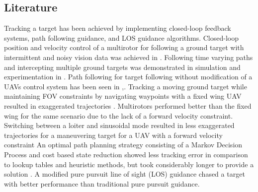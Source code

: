 \documentclass[conference]{IEEEtran}
\begin{document}
\subsection{Literature}








Tracking a target has been achieved by implementing closed-loop feedback systems, path following guidance, and LOS guidance algorithms. Closed-loop position and velocity control of a multirotor for following a ground target with intermittent and noisy vision data was achieved in \cite{teuliere_chasing_2011}. Following time varying paths and intercepting multiple ground targets was demonstrated in simulation and experimentation in \cite{oliveira_moving_2016}. Path following for target following without modification of a UAVs control system has been seen in \cite{baek_optimal_2013}\cite{ariyur_autonomous_2008},\cite{lee_strategies_2003}. Tracking a moving ground target while maintaining FOV constraints by navigating waypoints with a fixed wing UAV resulted in exaggerated trajectories \cite{ariyur_autonomous_2008}. Multirotors performed better than the fixed wing for the same scenario due to the lack of a forward velocity constraint. Switching between a loiter and sinusoidal mode resulted in less exaggerated trajectories for a maneuvering target for a UAV with a forward velocity constraint \cite{lee_strategies_2003} An optimal path planning strategy consisting of a Markov Decision Process and cost based state reduction showed less tracking error in comparison to lookup tables and heuristic methods, but took considerably longer to provide a solution \cite{baek_optimal_2013}. 
A modified pure pursuit line of sight (LOS) guidance chased a target with better performance than traditional pure pursuit guidance\cite{yamasaki_advanced_2009}.  
\end{document}
